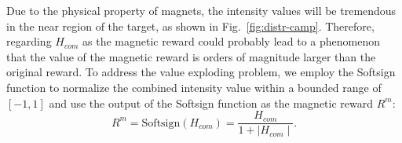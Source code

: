 \documentclass[journal]{IEEEtran}
\begin{document}
Due to the physical property of magnets, the intensity values will be tremendous in the near region of the target, as shown in Fig.~\ref{fig:distr-camp}.
Therefore, regarding $H_{com}$ as the magnetic reward could probably lead to a phenomenon that the value of the magnetic reward is orders of magnitude larger than the original reward.
To address the value exploding problem, we employ the Softsign function to normalize the combined intensity value within a bounded range of $[-1, 1]$ and use the output of the Softsign function as the magnetic reward $R^{m}$:
\begin{equation}
    R^{m} = \text{Softsign}(H_{com}) = \frac{H_{com}}{1 + \mid H_{com} \mid}.
\label{shaping_r}
\end{equation}
\end{document}
